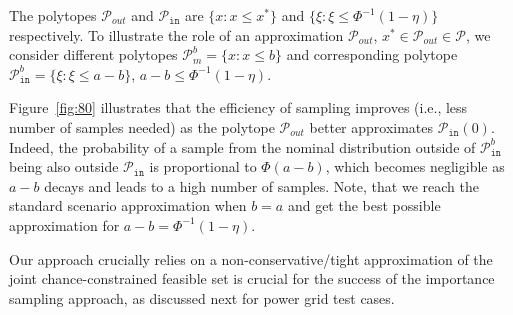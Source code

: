 The polytopes $\mathcal{P}_{out}$ and $\mathcal{P}_{\texttt{in}}$ are $\{x: x\le x^*\}$ and $\{\xi: \xi \leq \Phi^{-1}(1-\eta)\}$ respectively. To illustrate the role of an approximation $\mathcal{P}_{out}$, $x^* \in \mathcal{P}_{out} \in \mathcal{P}$, we consider different polytopes $\mathcal{P}^b_{m} = \{x: x\le b\}$ and corresponding polytope $\mathcal{P}_{\texttt{in}}^b = \{\xi: \xi \leq a - b\}$, $a - b \le \Phi^{-1}(1-\eta)$.  

Figure~\ref{fig:80} illustrates that the efficiency of sampling improves (i.e., less number of samples needed) as the polytope $\mathcal{P}_{out}$ better approximates $\mathcal{P}_{\texttt{in}}(0)$. Indeed, the probability of a sample from the nominal distribution outside of $\mathcal{P}_{\texttt{in}}^b$ being also outside $\mathcal{P}_{\texttt{in}}$ is proportional to $\Phi(a-b)$, which becomes negligible as $a-b$ decays and leads to a high number of samples. Note, that we reach the standard scenario approximation when $b = a$ and get the best possible approximation for $a-b = \Phi^{-1}(1-\eta)$. 



Our approach crucially relies on a non-conservative/tight approximation of the joint chance-constrained feasible set is crucial for the success of the importance sampling approach, as discussed next for power grid test cases. 

